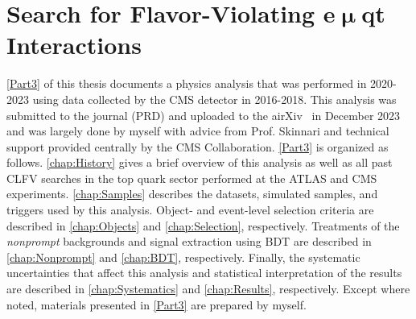 \part{Search for Flavor-Violating e$\bm{\upmu}$qt Interactions}
\label{Part3}
\autoref{Part3} of this thesis documents a physics analysis that was performed in 2020-2023 using data collected by the \ac{CMS} detector in 2016-2018. This analysis was submitted to the journal (PRD) and uploaded to the airXiv~\cite{CMS:2023phe} in December 2023 and was largely done by myself with advice from Prof. Skinnari and technical support provided centrally by the \ac{CMS} Collaboration. \autoref{Part3} is organized as follows. \autoref{chap:History} gives a brief overview of this analysis as well as all past \ac{CLFV} searches in the top quark sector performed at the \ac{ATLAS} and \ac{CMS} experiments. \autoref{chap:Samples} describes the datasets, simulated samples, and triggers used by this analysis. Object- and event-level selection criteria are described in \autoref{chap:Objects} and \autoref{chap:Selection}, respectively. Treatments of the \emph{nonprompt} backgrounds and signal extraction using \ac{BDT} are described in \autoref{chap:Nonprompt} and \autoref{chap:BDT}, respectively. Finally, the systematic uncertainties that affect this analysis and statistical interpretation of the results are described in \autoref{chap:Systematics} and \autoref{chap:Results}, respectively. Except where noted, materials presented in \autoref{Part3} are prepared by myself.







